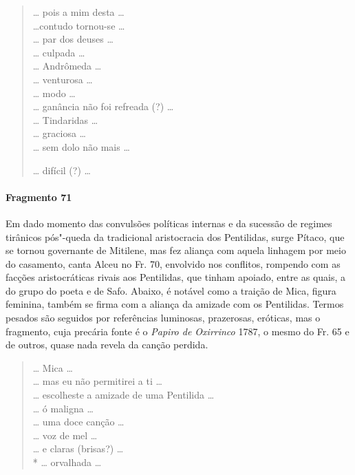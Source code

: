 {\begin{verse}
\ldots{} pois a mim desta \ldots{}\\
\ldots{}contudo tornou-se \ldots{}\\
\ldots{} par dos deuses \ldots{}\\
\ldots{} culpada \ldots{}\\
\ldots{} Andrômeda \ldots{}\\
\ldots{} venturosa \ldots{}\\
\ldots{} modo \ldots{}\\
\ldots{} ganância não foi refreada (?) \ldots{}\\
\ldots{} Tindaridas \ldots{}\\
\ldots{} graciosa \ldots{}\\
\ldots{} sem dolo não mais \ldots{}

\ast\quad\ast\quad\ast

\ldots{} difícil (?) \ldots{}
\end{verse}


\paragraph{Fragmento 71}

{\small Em dado momento das convulsões políticas internas e da sucessão de regimes
tirânicos pós"-queda da tradicional aristocracia dos Pentilidas, surge Pítaco, que se tornou governante de
Mitilene, mas fez aliança com aquela linhagem por meio do casamento,
canta Alceu no Fr. 70, envolvido nos conflitos,
rompendo com as facções aristocráticas rivais aos Pentilidas, que tinham apoiado, entre as quais, a
do grupo do poeta e de Safo. Abaixo, é notável como a traição de 
Mica, figura feminina, também se firma com a aliança da amizade com os Pentilidas. Termos
pesados são seguidos por referências luminosas, prazerosas, eróticas, mas o
fragmento, cuja precária fonte é o \textit{Papiro de Oxirrinco} 1787, o mesmo do Fr. 65 e de outros, quase nada revela da canção perdida.}

\begin{verse}
\ldots{} Mica \ldots{}\\
\ldots{} mas eu não permitirei a ti \ldots{}\\
\ldots{} escolheste a amizade de uma Pentilida \ldots{}\\
\ldots{} ó maligna \ldots{}\\
\ldots{} uma doce canção \ldots{}\\
\ldots{} voz de mel \ldots{}\\
\ldots{} e claras (brisas?) \ldots{}\\*
\ldots{} orvalhada \ldots{}
\end{verse}

}
